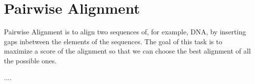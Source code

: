 \section{Pairwise Alignment}
Pairwise Alignment is to align two sequences of, for example, DNA, by inserting gaps inbetween the elements of the sequences.  The goal of this task is to maximize a score of the alignment so that we can choose the best alignment of all the possible ones.

....